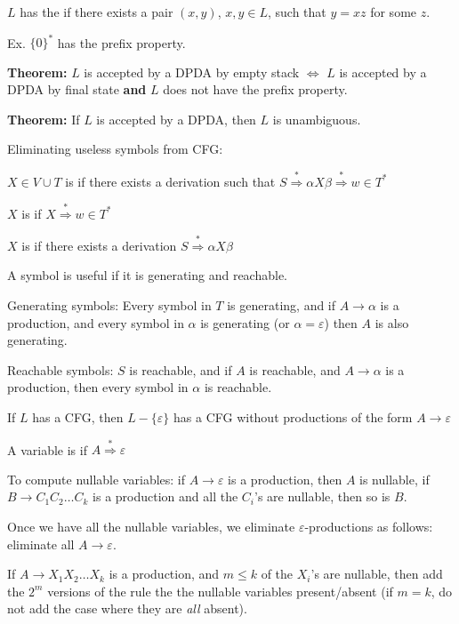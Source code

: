 \begin{frame}
$L$ has the  if there exists a pair $(x,y)$,
$x,y\in L$, such that $y=xz$ for some $z$.

Ex. $\{0\}^*$ has the prefix property.

{\bf Theorem:}  $L$ is accepted by a DPDA by empty stack $\iff$ $L$ is
accepted by a DPDA by final state {\bf and} $L$ does not have the
prefix property.

{\bf Theorem:}  If $L$ is accepted by a DPDA, then $L$ is unambiguous.
\end{frame}

\begin{frame}
Eliminating useless symbols from CFG:

$X\in V\cup T$ is  if there exists a derivation such that
$S\stackrel{*}{\Rightarrow}\alpha X\beta\stackrel{*}{\Rightarrow}w\in
T^*$ 

$X$ is  if $X\stackrel{*}{\Rightarrow}w\in T^*$

$X$ is  if there exists a derivation
$S\stackrel{*}{\Rightarrow}\alpha X\beta$

A symbol is useful if it is generating and reachable.

Generating symbols:
Every symbol in $T$ is generating, and if $A\longrightarrow\alpha$ is
a production, and every symbol in $\alpha$ is generating (or
$\alpha=\varepsilon$) then $A$ is also generating.

Reachable symbols:
$S$ is reachable, and if $A$ is reachable, and
$A\longrightarrow\alpha$ is a production, then every symbol in
$\alpha$ is reachable.
\end{frame}

\begin{frame}
If $L$ has a CFG, then $L-\{\varepsilon\}$ has a CFG without
productions of the form $A\longrightarrow\varepsilon$

A variable is  if
$A\stackrel{*}{\Rightarrow}\varepsilon$

To compute nullable variables: if $A\longrightarrow\varepsilon$ is a
production, then $A$ is nullable, if $B\longrightarrow C_1C_2\ldots
C_k$ is a production and all the $C_i$'s are nullable, then so is $B$.

Once we have all the nullable variables, we eliminate
$\varepsilon$-productions as follows: eliminate all
$A\longrightarrow\varepsilon$.

If $A\longrightarrow X_1X_2\ldots X_k$ is a production, and $m\le k$
of the $X_i$'s are nullable, then add the $2^m$ versions of the rule
the the nullable variables present/absent (if $m=k$, do not add the
case where they are {\em all} absent).
\end{frame}

